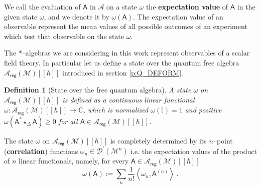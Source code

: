 \documentclass[11pt]{book}
\newcommand{\reg}{\mathsf{reg}}
\newcommand{\sm}[1]{\left\langle#1\right\rangle}
\newcommand{\Acal}{\mathcal{A}}
\newcommand{\Dcal}{\mathcal{D}}
\newcommand{\Mcal}{\mathcal{M}}
\newcommand{\Cbb}{\mathbb{C}}
\newcommand{\Ibb}{\mathbb{I}}
\newcommand{\Asf}{\mathsf{A}}
\theoremstyle{break}
\newtheorem{definition}{Definition}[chapter]
\begin{document}
\bigskip


We call the evaluation of $\Asf$ in $\Acal$ on a state $\omega$ the \textbf{expectation value} of $\Asf$ in the given state $\omega$, and we denote it by $\omega(\Asf)$. The expectation value of an observable represent the mean values of all possible outcomes of an experiment which test that observable on the state $\omega$.


\bigskip


The $\ast$--algebras we are considering in this work represent observables of a scalar field theory. In particular let us define a state over the quantum free algebra $\Acal_\reg(\Mcal)[[\hbar]]$ introduced in section \ref{p:Q_DEFORM}.


\begin{definition}[State over the free quantum algebra]
A state $\omega$ on $\Acal_\reg(\Mcal)[[\hbar]]$ is defined as a continuous linear functional $\omega : \Acal_\reg(\Mcal)[[\hbar]] \to \Cbb$, which is normalized $\omega(\Ibb)=1$ and positive $\omega(\Asf^\ast \star_\Delta \Asf) \geq 0$ for all $\Asf \in \Acal_\reg(\Mcal)[[\hbar]]$.
\end{definition}


The state $\omega$ on $\Acal_\reg(\Mcal)[[\hbar]]$ is completely determined by its $n$--point (\textbf{correlation}) functions $\omega_n \in \Dcal^\prime(\Mcal^n)$ i.e. the expectation values of the product of $n$ linear functionals, namely, for every $\Asf\in \Acal_\reg(\Mcal)[[\hbar]]$
%
\begin{equation*}
\omega(\Asf) := \sum_n \frac{1}{n!} \sm{\omega_n , \Asf^{(n)}} \ .
\end{equation*}
\end{document}
